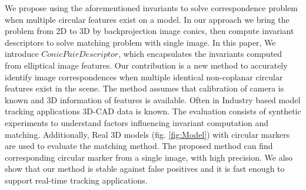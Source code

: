 \documentclass{bmvc2k}
\newcommand{\yuji}[1]{\textcolor{magenta}{[Yuji: #1]}}
\begin{document}
We propose using the aforementioned invariants to solve correspondence problem when multiple circular features exist on a model. 
In our approach we bring the problem from 2D to 3D by backprojection image conics, then compute invariant descriptors to solve matching problem with single image.
In this paper, We introduce $ Conic Pair Descriptor $, which encapsulates the invariants computed from elliptical image features.
Our contribution is a new method to accurately identify image correspondences when multiple identical non-coplanar circular features exist in the scene. 
The method assumes that calibration of camera is known and 3D information of features is available. 
Often in Industry based model tracking applications 3D-CAD data is known. 
The evaluation consists of synthetic experiments to understand factors influencing invariant computation and matching. 
Additionally, Real 3D models (fig. \ref{fig:Model}) with circular markers are used to evaluate the matching method. The proposed method can find corresponding circular marker from a single image, with high precision. We also show that our method is stable against false positives and it is fast enough to support real-time tracking applications. 


\end{document}
